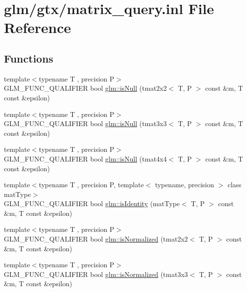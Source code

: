 \hypertarget{matrix__query_8inl}{\section{glm/gtx/matrix\-\_\-query.inl File Reference}
\label{matrix__query_8inl}
}
\subsection*{Functions}
\begin{DoxyCompactItemize}
\item 
{\footnotesize template$<$typename T , precision P$>$ }\\G\-L\-M\-\_\-\-F\-U\-N\-C\-\_\-\-Q\-U\-A\-L\-I\-F\-I\-E\-R bool \hyperlink{group__gtx__matrix__query_ga37e535cbeaea383b8c1247b98875cd4b}{glm\-::is\-Null} (tmat2x2$<$ T, P $>$ const \&m, T const \&epsilon)
\item 
{\footnotesize template$<$typename T , precision P$>$ }\\G\-L\-M\-\_\-\-F\-U\-N\-C\-\_\-\-Q\-U\-A\-L\-I\-F\-I\-E\-R bool \hyperlink{group__gtx__matrix__query_gac67a5c7e029a84b74b02ac9599b8972d}{glm\-::is\-Null} (tmat3x3$<$ T, P $>$ const \&m, T const \&epsilon)
\item 
{\footnotesize template$<$typename T , precision P$>$ }\\G\-L\-M\-\_\-\-F\-U\-N\-C\-\_\-\-Q\-U\-A\-L\-I\-F\-I\-E\-R bool \hyperlink{group__gtx__matrix__query_ga326de496972051413c7b44b85fc9cb6e}{glm\-::is\-Null} (tmat4x4$<$ T, P $>$ const \&m, T const \&epsilon)
\item 
{\footnotesize template$<$typename T , precision P, template$<$ typename, precision $>$ class mat\-Type$>$ }\\G\-L\-M\-\_\-\-F\-U\-N\-C\-\_\-\-Q\-U\-A\-L\-I\-F\-I\-E\-R bool \hyperlink{group__gtx__matrix__query_gafc1ce12c738b8c5d007179e615609330}{glm\-::is\-Identity} (mat\-Type$<$ T, P $>$ const \&m, T const \&epsilon)
\item 
{\footnotesize template$<$typename T , precision P$>$ }\\G\-L\-M\-\_\-\-F\-U\-N\-C\-\_\-\-Q\-U\-A\-L\-I\-F\-I\-E\-R bool \hyperlink{group__gtx__matrix__query_ga11a8d5cdb36496b85f61e4f5f7f2602c}{glm\-::is\-Normalized} (tmat2x2$<$ T, P $>$ const \&m, T const \&epsilon)
\item 
{\footnotesize template$<$typename T , precision P$>$ }\\G\-L\-M\-\_\-\-F\-U\-N\-C\-\_\-\-Q\-U\-A\-L\-I\-F\-I\-E\-R bool \hyperlink{group__gtx__matrix__query_ga351bcc8d485d329b78cfa875e084964d}{glm\-::is\-Normalized} (tmat3x3$<$ T, P $>$ const \&m, T const \&epsilon)

\end{DoxyCompactItemize}
